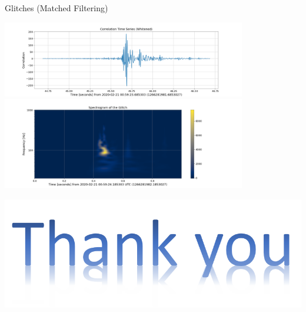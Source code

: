 \documentclass[xcolor=dvipsnames]{beamer}
\begin{document}
\begin{frame}[t]{Glitches (Matched Filtering)}
  \begin{center}
    \includegraphics[width=0.8\textwidth]{image/Correlation_ts_Glitch_H1.png}
    \includegraphics[width=0.8\textwidth]{image/Spectrogram_Glitch_H1.png}
  \end{center}
\end{frame}

\begin{frame}[c]{}
  \begin{center}
    \includegraphics[scale=0.5]{image/Thankyou.png}
  \end{center}
\end{frame}

\end{document}
